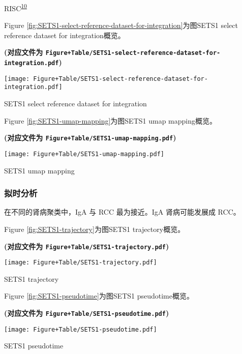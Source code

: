 \documentclass[
]{article}
\begin{document}
RISC\textsuperscript{\protect\hyperlink{ref-RobustIntegratLiuY2021}{10}}

Figure \ref{fig:SETS1-select-reference-dataset-for-integration}为图SETS1 select reference dataset for integration概览。

\textbf{(对应文件为 \texttt{Figure+Table/SETS1-select-reference-dataset-for-integration.pdf})}

\def\@captype{figure}
\begin{center}
\texttt{[image: Figure+Table/SETS1-select-reference-dataset-for-integration.pdf]}
\caption{SETS1 select reference dataset for integration}\label{fig:SETS1-select-reference-dataset-for-integration}
\end{center}

Figure \ref{fig:SETS1-umap-mapping}为图SETS1 umap mapping概览。

\textbf{(对应文件为 \texttt{Figure+Table/SETS1-umap-mapping.pdf})}

\def\@captype{figure}
\begin{center}
\texttt{[image: Figure+Table/SETS1-umap-mapping.pdf]}
\caption{SETS1 umap mapping}\label{fig:SETS1-umap-mapping}
\end{center}

\hypertarget{ux62dfux65f6ux5206ux6790}{%
\subsubsection{拟时分析}\label{ux62dfux65f6ux5206ux6790}}

在不同的肾病聚类中，IgA 与 RCC 最为接近。IgA 肾病可能发展成 RCC。

Figure \ref{fig:SETS1-trajectory}为图SETS1 trajectory概览。

\textbf{(对应文件为 \texttt{Figure+Table/SETS1-trajectory.pdf})}

\def\@captype{figure}
\begin{center}
\texttt{[image: Figure+Table/SETS1-trajectory.pdf]}
\caption{SETS1 trajectory}\label{fig:SETS1-trajectory}
\end{center}

Figure \ref{fig:SETS1-pseudotime}为图SETS1 pseudotime概览。

\textbf{(对应文件为 \texttt{Figure+Table/SETS1-pseudotime.pdf})}

\def\@captype{figure}
\begin{center}
\texttt{[image: Figure+Table/SETS1-pseudotime.pdf]}
\caption{SETS1 pseudotime}\label{fig:SETS1-pseudotime}
\end{center}
\end{document}
